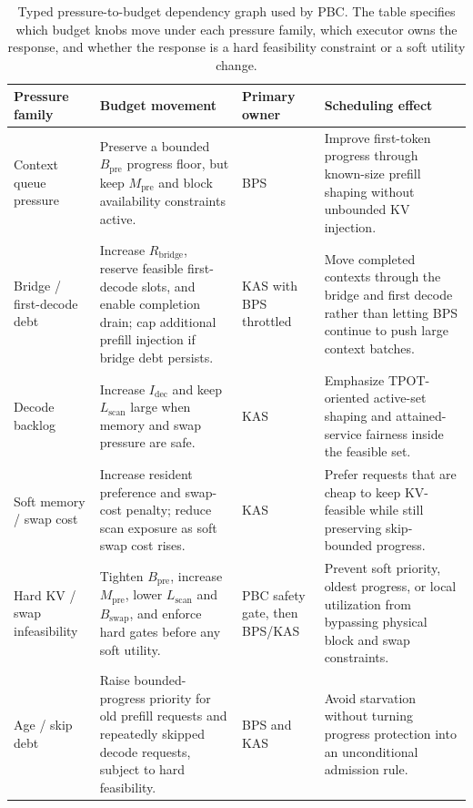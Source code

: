 \documentclass[lettersize,journal]{IEEEtran}
\begin{document}
\begin{table}[t]
\centering
\caption{Typed pressure-to-budget dependency graph used by PBC. The table specifies which budget knobs move under each pressure family, which executor owns the response, and whether the response is a hard feasibility constraint or a soft utility change.}
\label{tab:pbc-mapping}
\scriptsize
\begin{tabular}{@{}>{\raggedright\arraybackslash}p{}>{\raggedright\arraybackslash}p{}>{\raggedright\arraybackslash}p{}>{\raggedright\arraybackslash}p{}@{}}
\hline
\textbf{Pressure family} & \textbf{Budget movement} & \textbf{Primary owner} & \textbf{Scheduling effect}\\
\hline
Context queue pressure & Preserve a bounded $B_{\mathrm{pre}}$ progress floor, but keep $M_{\mathrm{pre}}$ and block availability constraints active. & BPS & Improve first-token progress through known-size prefill shaping without unbounded KV injection.\\
Bridge / first-decode debt & Increase $R_{\mathrm{bridge}}$, reserve feasible first-decode slots, and enable completion drain; cap additional prefill injection if bridge debt persists. & KAS with BPS throttled & Move completed contexts through the bridge and first decode rather than letting BPS continue to push large context batches.\\
Decode backlog & Increase $I_{\mathrm{dec}}$ and keep $L_{\mathrm{scan}}$ large when memory and swap pressure are safe. & KAS & Emphasize TPOT-oriented active-set shaping and attained-service fairness inside the feasible set.\\
Soft memory / swap cost & Increase resident preference and swap-cost penalty; reduce scan exposure as soft swap cost rises. & KAS & Prefer requests that are cheap to keep KV-feasible while still preserving skip-bounded progress.\\
Hard KV / swap infeasibility & Tighten $B_{\mathrm{pre}}$, increase $M_{\mathrm{pre}}$, lower $L_{\mathrm{scan}}$ and $B_{\mathrm{swap}}$, and enforce hard gates before any soft utility. & PBC safety gate, then BPS/KAS & Prevent soft priority, oldest progress, or local utilization from bypassing physical block and swap constraints.\\
Age / skip debt & Raise bounded-progress priority for old prefill requests and repeatedly skipped decode requests, subject to hard feasibility. & BPS and KAS & Avoid starvation without turning progress protection into an unconditional admission rule.\\
\hline
\end{tabular}
\end{table}
\end{document}

